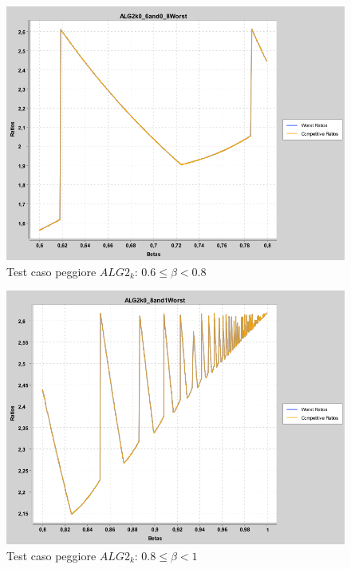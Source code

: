 \documentclass[twoside,openany,titlepage,fleqn,
	headinclude,12pt,a4paper,BCOR5mm,footinclude]{scrbook}
\begin{document}
\begin{figure}[H]
\caption{Test caso peggiore $ALG2_{k}$: $0.6 \leq \beta < 0.8$}
\centering
\includegraphics[scale=0.4]{worst/ALG2k0_6and0_8Worst.png}
\end{figure}
\begin{figure}[H]
\caption{Test caso peggiore $ALG2_{k}$: $0.8 \leq \beta < 1$}
\centering
\includegraphics[scale=0.4]{worst/ALG2k0_8and1Worst.png}
\end{figure}
\end{document}
